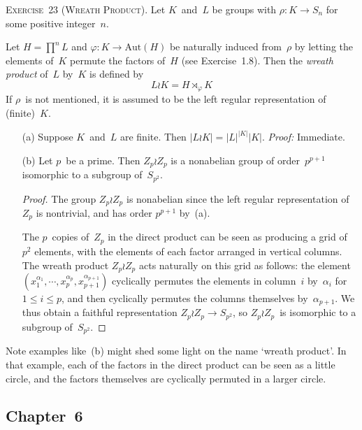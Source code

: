 \documentclass[letterpaper]{article}
\newcommand{\exercise}[1]{\goodbreak\noindent\textsc{Exercise~{#1}.}}
\newcommand{\aut}{\mathrm{Aut}}
\newcommand{\ord}[1]{|{#1}|}
\begin{document}
\bigskip
\exercise{23 (Wreath Product)}
Let $K$~and~$L$ be groups with $\rho:K\to S_n$ for some positive integer~$n$.

Let $H=\prod^n L$ and $\varphi:K\to\aut(H)$ be naturally induced from~$\rho$ by letting the elements of~$K$ permute the factors of~$H$ (see Exercise~1.8). Then the \emph{wreath product} of~$L$ by~$K$ is defined by
$$L\wr K=H\rtimes_{\varphi} K$$
If $\rho$~is not mentioned, it is assumed to be the left regular representation of (finite)~$K$.
\begin{enumerate}[itemsep=0pt]
\item[(a)] Suppose $K$~and~$L$ are finite. Then $\ord{L\wr K}=\ord{L}^{\ord{K}}\ord{K}$. \emph{Proof:} Immediate.
\item[(b)] Let $p$~be a prime. Then $Z_p\wr Z_p$ is a nonabelian group of order~$p^{p+1}$ isomorphic to a subgroup of~$S_{p^2}$.
\begin{proof}
The group $Z_p\wr Z_p$ is nonabelian since the left regular representation of~$Z_p$ is nontrivial, and has order $p^{p+1}$ by~(a).

The $p$~copies of~$Z_p$ in the direct product can be seen as producing a grid of~$p^2$ elements, with the elements of each factor arranged in vertical columns. The wreath product $Z_p\wr Z_p$ acts naturally on this grid as follows: the element $(x_1^{\alpha_1},\cdots,x_p^{\alpha_p},x_{p+1}^{\alpha_{p+1}})$ cyclically permutes the elements in column~$i$ by~$\alpha_i$ for $1\le i\le p$, and then cyclically permutes the columns themselves by~$\alpha_{p+1}$. We thus obtain a faithful representation $Z_p\wr Z_p\to S_{p^2}$, so $Z_p\wr Z_p$~is isomorphic to a subgroup of~$S_{p^2}$.
\end{proof}
\end{enumerate}
\noindent Note examples like~(b) might shed some light on the name `wreath product'. In that example, each of the factors in the direct product can be seen as a little circle, and the factors themselves are cyclically permuted in a larger circle.

\subsection*{Chapter~6}
\end{document}
